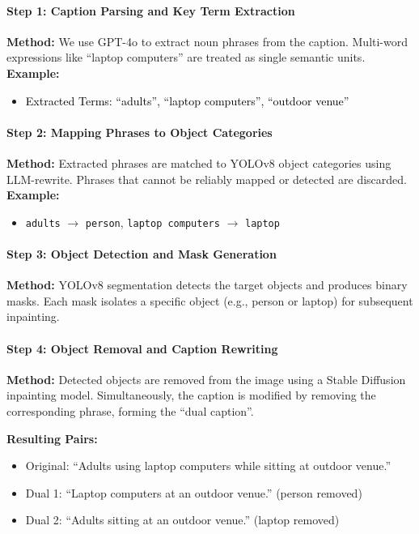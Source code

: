 \documentclass[11pt,letterpaper]{article}
\begin{document}
\paragraph*{Step 1: Caption Parsing and Key Term Extraction}
\textbf{Method:} We use GPT-4o to extract noun phrases from the caption. Multi-word expressions like ``laptop computers'' are treated as single semantic units.
\noindent
\textbf{Example:}
\begin{itemize}
  \item \textcolor{black}{Extracted Terms: ``adults'', ``laptop computers'', ``outdoor venue''}
\end{itemize}

\paragraph*{Step 2: Mapping Phrases to Object Categories}
\textbf{Method:} Extracted phrases are matched to YOLOv8\cite{ultralytics2023segment} object categories using LLM-rewrite. Phrases that cannot be reliably mapped or detected are discarded.
\noindent
\textbf{Example:}
\begin{itemize}
  \item \texttt{adults} $\to$ \texttt{person}, \texttt{laptop computers} $\to$ \texttt{laptop}
\end{itemize}

\paragraph*{Step 3: Object Detection and Mask Generation}

\textbf{Method:} YOLOv8 segmentation detects the target objects and produces binary masks. Each mask isolates a specific object (e.g., person or laptop) for subsequent inpainting.

\paragraph*{Step 4: Object Removal and Caption Rewriting}

\textbf{Method:} Detected objects are removed from the image using a Stable Diffusion inpainting model\cite{stabilityai2023inpainting}. Simultaneously, the caption is modified by removing the corresponding phrase, forming the ``dual caption''.

\noindent
\textbf{Resulting Pairs:}
\begin{itemize}
    \item {Original: ``Adults using laptop computers while sitting at outdoor venue.''}
    \item {Dual 1: ``Laptop computers at an outdoor venue.'' (person removed)}
    \item {Dual 2: ``Adults sitting at an outdoor venue.'' (laptop removed)}
\end{itemize}
\end{document}
